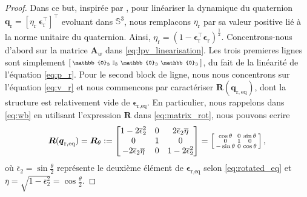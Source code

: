 \begin{proof}
Dans ce but, inspirée par \cite[Proof of Lemma 1]{tregouetHal-01760720}, pour linéariser la dynamique du quaternion $\boldsymbol{q}_{\text{r}} = \left[ \eta_{\text{r}} ~ \boldsymbol{\epsilon}_{\text{r}}^\top \right]^\top$ evoluant dans ${\mathbb S}^3$, nous remplacons  $\eta_{\text{r}}$ par sa valeur positive lié à la norme unitaire du quaternion. Ainsi, $\eta_{\text{r}} = (1- \boldsymbol{\epsilon}_{\text{r}}^\top \boldsymbol{\epsilon}_{\text{r}})^\frac{1}{2}$.
Concentrons-nous d'abord sur la matrice $\boldsymbol{A}_w$ dans \eqref{eq:lpv_linearisation}. Les trois premieres lignes sont simplement $\smallmat{\mathbb{0}_{3} & \mathbb{I}_{3} & \mathbb{0}_{3} &\mathbb{0}_{3}}$, du fait de la linéarité de l'équation \eqref{eq:p_r}. 
Pour le second block de ligne, nous nous concentrons sur l'équation \eqref{eq:v_r}
et nous commencons par caractériser $\boldsymbol{R}(\boldsymbol{q}_{\mathrm{r,eq}})$, dont la structure est relativement vide de $\boldsymbol{\epsilon}_{\text{r,eq}}$. En particulier, nous rappelons dans \eqref{eq:wb} en utilisant l'expression $\boldsymbol{R}$ dans \eqref{eq:matrix_rot}, nous pouvons ecrire
\begin{align*}
    \boldsymbol{R}(\boldsymbol{q}_{\mathrm{r,eq}\textbf{}})= \boldsymbol{R}_\theta :=
     \begin{bmatrix}1-2\overline \epsilon_{2}^{2} & 0 & 2\overline\epsilon_{2} \overline{\eta} \\ 0 & 1 & 0 \\ -2\overline\epsilon_{2} \overline{\eta} & 0 & 1-2\overline\epsilon_{2}^{2} \end{bmatrix}
    = \left[ \begin{smallmatrix} \cos \theta & 0 & \sin \theta \\ 0 & 1 & 0 \\ -\sin \theta & 0 & \cos \theta  \end{smallmatrix} \right],
\end{align*}
où $\overline \epsilon_{2} = \sin{\frac{\theta}{2}}$ représente le deuxième élément de $\boldsymbol{\epsilon}_{\text{r,eq}}$ selon \eqref{eq:rotated_eq} et $ \overline{\eta} = \sqrt{1-\overline \epsilon_{2}^{2}} = \cos{\frac{\theta}{2}}$.


\end{proof}
